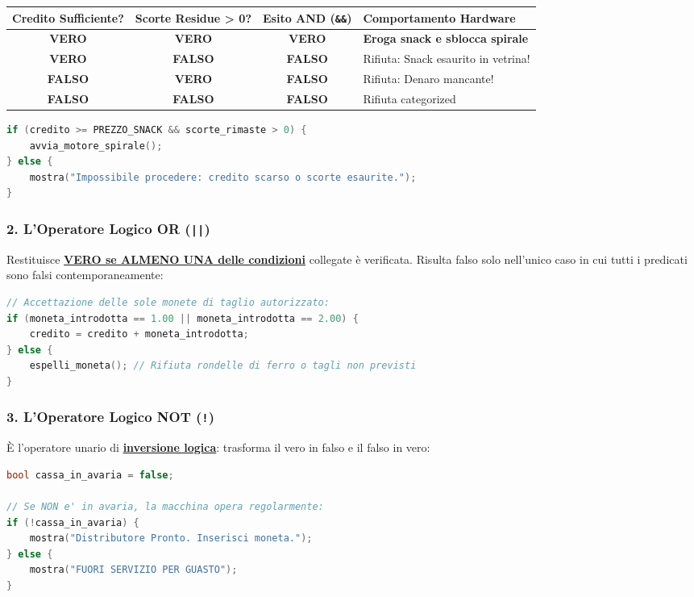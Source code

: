 \begin{center}
\small
\begin{tabular}{|c|c|c|l|}
\hline
\rowcolor{PiazzaPrimary!15}
\textbf{Credito Sufficiente?} & \textbf{Scorte Residue > 0?} & \textbf{Esito AND (\texttt{\&\&})} & \textbf{Comportamento Hardware} \\
\hline
\rowcolor{BoxGreen!10}
\textbf{VERO} & \textbf{VERO} & \textbf{\color{BoxGreen}VERO} & \textbf{Eroga snack e sblocca spirale} \\
\hline
\textbf{VERO} & \textbf{FALSO} & \textbf{\color{BoxRed}FALSO} & Rifiuta: Snack esaurito in vetrina! \\
\hline
\textbf{FALSO} & \textbf{VERO} & \textbf{\color{BoxRed}FALSO} & Rifiuta: Denaro mancante! \\
\hline
\textbf{FALSO} & \textbf{FALSO} & \textbf{\color{BoxRed}FALSO} & Rifiuta categorized \\
\hline
\end{tabular}
\end{center}

\begin{lstlisting}[language=C++]
if (credito >= PREZZO_SNACK && scorte_rimaste > 0) {
    avvia_motore_spirale();
} else {
    mostra("Impossibile procedere: credito scarso o scorte esaurite.");
}
\end{lstlisting}

\subsubsection{2. L'Operatore Logico OR (\texttt{||})}
Restituisce \textbf{\underline{VERO se ALMENO UNA delle condizioni}} collegate è verificata. Risulta falso solo nell'unico caso in cui tutti i predicati sono falsi contemporaneamente:

\begin{lstlisting}[language=C++]
// Accettazione delle sole monete di taglio autorizzato:
if (moneta_introdotta == 1.00 || moneta_introdotta == 2.00) {
    credito = credito + moneta_introdotta;
} else {
    espelli_moneta(); // Rifiuta rondelle di ferro o tagli non previsti
}
\end{lstlisting}

\subsubsection{3. L'Operatore Logico NOT (\texttt{!})}
È l'operatore unario di \textbf{\underline{inversione logica}}: trasforma il vero in falso e il falso in vero:
\begin{lstlisting}[language=C++]
bool cassa_in_avaria = false;

// Se NON e' in avaria, la macchina opera regolarmente:
if (!cassa_in_avaria) {
    mostra("Distributore Pronto. Inserisci moneta.");
} else {
    mostra("FUORI SERVIZIO PER GUASTO");
}
\end{lstlisting}

